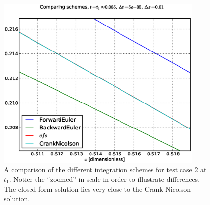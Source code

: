 \begin{figure}[htbp]
    \centering
    \includegraphics[width=0.9\textwidth]{plots/schemes_case2_t1_zoomed.eps}
    \caption{A comparison of the different integration schemes for
    test case 2 at $t_1$. Notice the ``zoomed'' in scale in order
    to illustrate differences. The closed form solution lies very
    close to the Crank Nicolson solution.}
    \label{fig:zoomed_schemes}
\end{figure}
